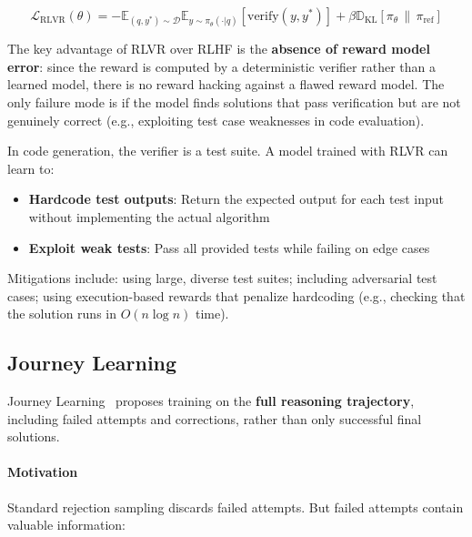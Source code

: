 \begin{equation}
    \mathcal{L}_{\text{RLVR}}(\theta) = -\mathbb{E}_{(q, y^*) \sim \mathcal{D}} \mathbb{E}_{y \sim \pi_\theta(\cdot|q)} \left[ \text{verify}(y, y^*) \right] + \beta \mathbb{D}_{\mathrm{KL}}\!\left[\pi_\theta \,\|\, \pi_{\text{ref}}\right]
\end{equation}

The key advantage of RLVR over RLHF is the \textbf{absence of reward model error}: since the reward is computed by a deterministic verifier rather than a learned model, there is no reward hacking against a flawed reward model. The only failure mode is if the model finds solutions that pass verification but are not genuinely correct (e.g., exploiting test case weaknesses in code evaluation).

\begin{examplebox}
In code generation, the verifier is a test suite. A model trained with RLVR can learn to:

\begin{itemize}
  \item \textbf{Hardcode test outputs}: Return the expected output for each test input without implementing the actual algorithm
  \item \textbf{Exploit weak tests}: Pass all provided tests while failing on edge cases
\end{itemize}

Mitigations include: using large, diverse test suites; including adversarial test cases; using execution-based rewards that penalize hardcoding (e.g., checking that the solution runs in $O(n \log n)$ time).
\end{examplebox}

\subsection{Journey Learning}
\label{journey-learning}

Journey Learning~\cite{qin2024o1journey} proposes training on the \textbf{full reasoning trajectory}, including failed attempts and corrections, rather than only successful final solutions.

\paragraph{Motivation}
\label{motivation}

Standard rejection sampling discards failed attempts. But failed attempts contain valuable information:

